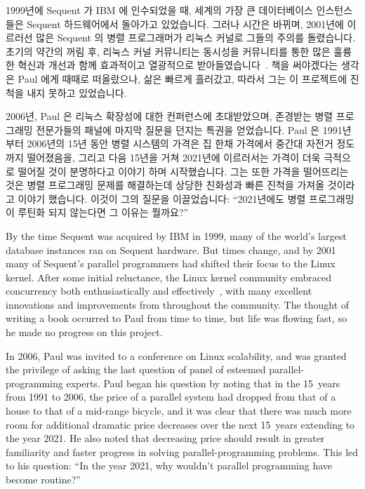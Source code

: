 \fi

1999년에 Sequent 가 IBM 에 인수되었을 때, 세계의 가장 큰 데이터베이스
인스턴스들은 Sequent 하드웨어에서 돌아가고 있었습니다.
그러나 시간은 바뀌며, 2001년에 이르러선 많은 Sequent 의 병렬 프로그래머가
리눅스 커널로 그들의 주의를 돌렸습니다.
초기의 약간의 꺼림 후, 리눅스 커널 커뮤니티는 동시성을
커뮤니티를 통한 많은 훌륭한 혁신과 개선과 함께 효과적이고 열광적으로
받아들였습니다~\cite{SilasBoydWickizer2010LinuxScales48,McKenney:2012:BEP:2414729.2414734}.
책을 써야겠다는 생각은 Paul 에게 때때로 떠올랐으나, 삶은 빠르게 흘러갔고,
따라서 그는 이 프로젝트에 진척을 내지 못하고 있었습니다.

2006년, Paul 은 리눅스 확장성에 대한 컨퍼런스에 초대받았으며, 존경받는 병렬
프로그래밍 전문가들의 패널에 마지막 질문을 던지는 특권을 얻었습니다.
Paul 은 1991년부터 2006년의 15년 동안 병렬 시스템의 가격은 집 한채 가격에서
중간대 자전거 정도까지 떨어졌음을, 그리고 다음 15년을 거쳐 2021년에 이르러서는
가격이 더욱 극적으로 떨어질 것이 분명하다고 이야기 하며 시작했습니다.
그는 또한 가격을 떨어뜨리는 것은 병렬 프로그래밍 문제를 해결하는데 상당한
친화성과 빠른 진척을 가져올 것이라고 이야기 했습니다.
이것이 그의 질문을 이끌었습니다:
``2021년에도 병렬 프로그래밍이 루틴화 되지 않는다면 그 이유는 뭘까요?''

\iffalse

By the time Sequent was acquired by IBM in 1999, many of the world's
largest database instances ran on Sequent hardware.
But times change, and by 2001 many of Sequent's parallel programmers
had shifted their focus to the Linux kernel.
After some initial reluctance, the Linux kernel community embraced
concurrency both enthusiastically and
effectively~\cite{SilasBoydWickizer2010LinuxScales48,McKenney:2012:BEP:2414729.2414734},
with many excellent innovations and improvements from throughout the
community.
The thought of writing a book occurred to Paul from time to time, but
life was flowing fast, so he made no progress on this project.

In 2006, Paul was invited to a conference on Linux scalability, and was
granted the privilege of asking the last question of panel of esteemed
parallel-programming experts.
Paul began his question by noting that in the 15~years from 1991 to 2006,
the price of a parallel system had dropped from that of a house to that
of a mid-range bicycle, and it was clear that there was much more room
for additional dramatic price decreases over the next 15~years
extending to the year 2021.
He also noted that decreasing price should result in greater familiarity
and faster progress in solving parallel-programming problems.
This led to his question:
``In the year 2021, why wouldn't parallel programming have become routine?''

